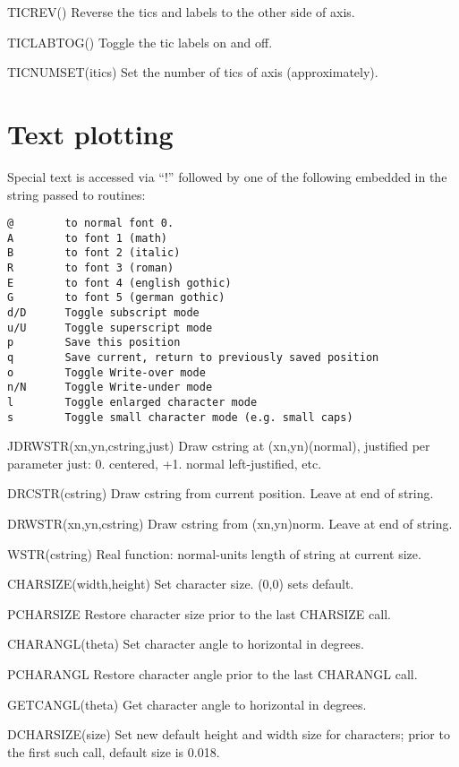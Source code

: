 \documentclass[12pt]{article}
\newif \iftth
\begin{document}
TICREV() Reverse the tics and labels to the other side of axis.

TICLABTOG() Toggle the tic labels on and off.

TICNUMSET(itics) Set the number of tics of axis (approximately).

\section{Text plotting}

\iftth \special{html:<img align="right" src="fontshow.png">} \fi

Special text is accessed via ``!'' followed by one of 
the following embedded in the string passed to routines:
\begin{verbatim}
@        to normal font 0.
A        to font 1 (math)
B        to font 2 (italic)
R        to font 3 (roman)
E        to font 4 (english gothic)
G        to font 5 (german gothic)
d/D      Toggle subscript mode
u/U      Toggle superscript mode
p        Save this position
q        Save current, return to previously saved position
o        Toggle Write-over mode
n/N      Toggle Write-under mode
l        Toggle enlarged character mode
s        Toggle small character mode (e.g. small caps)
\end{verbatim}


JDRWSTR(xn,yn,cstring,just) Draw cstring at (xn,yn)(normal), justified
per parameter just:  0. centered, +1. normal left-justified, etc.

DRCSTR(cstring) Draw cstring from current position. Leave at end of string.

DRWSTR(xn,yn,cstring) Draw cstring from (xn,yn)norm. Leave at end of
string.

WSTR(cstring) Real function: normal-units length of string at current size.

CHARSIZE(width,height) Set character size. (0,0) sets default.

PCHARSIZE Restore character size prior to the last CHARSIZE call.

CHARANGL(theta) Set character angle to horizontal in degrees.

PCHARANGL Restore character angle prior to the last CHARANGL call. 

GETCANGL(theta) Get character angle to horizontal in degrees.

DCHARSIZE(size) Set new default height and width size for characters; 
prior to the first such call, default size is 0.018. 
\end{document}
